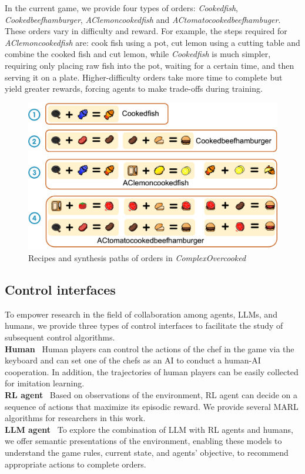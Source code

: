 In the current game, we provide four types of orders: \textit{Cookedfish}, \textit{Cookedbeefhamburger}, \textit{AClemoncookedfish} and \textit{ACtomatocookedbeefhambuger}. These orders vary in difficulty and reward. For example, the steps required for \textit{AClemoncookedfish} are: cook fish using a pot, cut lemon using a cutting table and combine the cooked fish and cut lemon,  while \textit{Cookedfish} is much simpler, requiring only placing raw fish into the pot, waiting for a certain time, and then serving it on a plate. Higher-difficulty orders take more time to complete but yield greater rewards, forcing agents to make trade-offs during training.
\begin{figure}[H]
    \centering
    \includegraphics[width=\linewidth]{Figures/recipe.png}
  \caption{Recipes and synthesis paths of orders in \textit{ComplexOvercooked}}
\label{fig:recipe}
\end{figure}

\subsection{Control interfaces}
To empower research in the field of collaboration among agents, LLMs, and humans, we provide three types of control interfaces to facilitate the study of subsequent control algorithms.\\
\textbf{Human} \ Human players can control the actions of the chef in the game via the keyboard and can set one of the chefs as an AI to conduct a human-AI cooperation. In addition, the trajectories of human players can be easily collected for imitation learning. \\
\textbf{RL agent} \ Based on observations of the environment, RL agent can decide on a sequence of actions that maximize its episodic reward. We provide several MARL algorithms for researchers in this work. \\
\textbf{LLM agent} \ To explore the combination of LLM with  RL agents and humans, we offer semantic presentations of the environment, enabling these models to understand the game rules, current state, and agents' objective, to recommend appropriate actions to complete orders.\\
